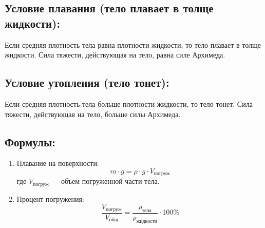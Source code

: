 \documentclass[a4paper,12pt]{article}
\begin{document}
\vspace{-9pt}
\subsection*{Условие плавания (тело плавает в толще жидкости):}
\vspace{-3pt}
Если средняя плотность тела равна плотности жидкости, то тело плавает в толще жидкости. Сила тяжести, действующая на тело, равна силе Архимеда.

\vspace{-9pt}
\subsection*{Условие утопления (тело тонет):}
\vspace{-3pt}
Если средняя плотность тела больше плотности жидкости, то тело тонет. Сила тяжести, действующая на тело, больше силы Архимеда.

\vspace{-9pt}
\subsection*{Формулы:}
\vspace{-3pt}
\begin{enumerate}[itemsep=0pt, topsep=0pt, parsep=2pt]
    \item Плавание на поверхности:
    \vspace{-0.05em}
    $$ m \cdot g = \rho \cdot g \cdot V_{погруж} $$
    где $V_{погруж}$ — объем погруженной части тела.
    \item Процент погружения:
    \vspace{-0.05em}
    $$ \frac{V_{погруж}}{V_{общ}} = \frac{\rho_{тела}}{\rho_{жидкости}} \cdot 100\% $$
\end{enumerate}
\end{document}
